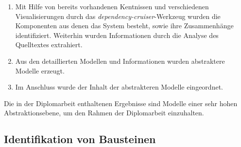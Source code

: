 



\begin{enumerate}
    \item Mit Hilfe von bereits vorhandenen Kentnissen  und verschiedenen Visualisierungen durch das \emph{dependency-cruiser}-Werkzeug wurden die Komponenten aus denen das System besteht, sowie ihre Zusammenhänge identifiziert. Weiterhin wurden Informationen durch die Analyse des Quelltextes extrahiert. 
    \item Aus den detaillierten Modellen und Informationen wurden abstraktere Modelle erzeugt.
    \item Im Anschluss wurde der Inhalt der abstrakteren Modelle eingeordnet.
\end{enumerate}

Die in der Diplomarbeit enthaltenen Ergebnisse sind Modelle einer sehr hohen Abstraktionsebene, um den Rahmen der Diplomarbeit einzuhalten.



\subsection{Identifikation von Bausteinen}


